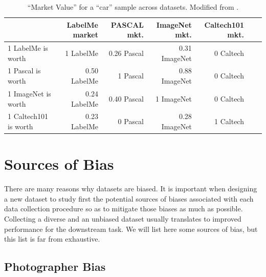 \begin{table}[h]
\caption{``Market Value'' for a ``car'' sample across datasets. Modified from \cite{Torralba2011}.} 
\label{table:market_bias}
\begin{small}
\begin{tabular}{|l|r|r|r|r|r|r|}
\hline
             & LabelMe market & PASCAL mkt. & 
ImageNet mkt. & Caltech101 mkt.  \\
\hline
1 LabelMe is worth     & 1 LabelMe &   0.26 Pascal &
 0.31 ImageNet & 0 Caltech  \\
1 Pascal is worth      & 0.50 LabelMe & 1 Pascal &
 0.88 ImageNet & 0 Caltech  \\
1 ImageNet is worth    &  0.24 LabelMe &  0.40 Pascal &
 1 ImageNet &  0 Caltech  \\
1 Caltech101 is worth  &  0.23 LabelMe &  0 Pascal &
 0.28 ImageNet & 1 Caltech  \\
\hline
\end{tabular}
\end{small}
\end{table}


\section{Sources of Bias}

There are many reasons why datasets are biased. It is important when designing a new dataset to study first the potential sources of biases associated with each data collection procedure so as to mitigate those biases as much as possible. Collecting a diverse and an unbiased dataset  usually translates to improved performance for the downstream task. We will list here some sources of bias, but this list is far from exhaustive. 

\subsection{Photographer Bias}

